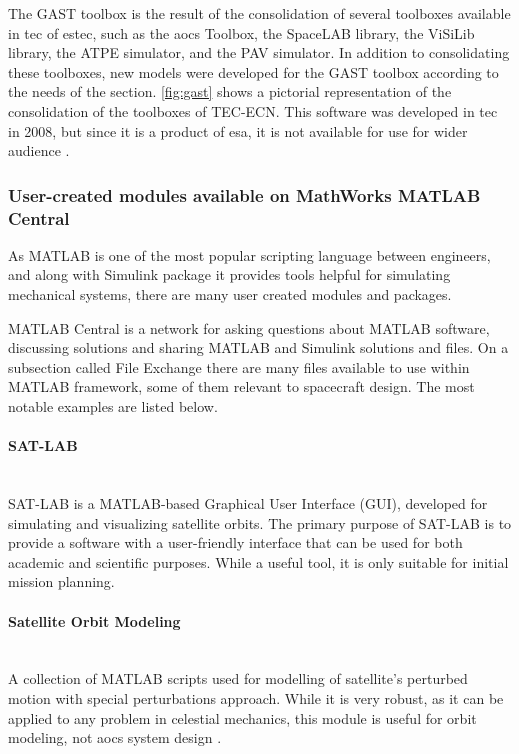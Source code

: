         The GAST toolbox is the result of the consolidation of several toolboxes available in \ac{tec} of \ac{estec}, such as the \ac{aocs} Toolbox, the SpaceLAB library, the ViSiLib library, the ATPE simulator, and the PAV simulator. In addition to consolidating these toolboxes, new models were developed for the GAST toolbox according to the needs of the section. \autoref{fig:gast} shows a pictorial representation of the consolidation of the toolboxes of TEC-ECN. This software was developed in \ac{tec} in 2008, but since it is a product of \ac{esa}, it is not available for use for wider audience \cite{gast}.

    \subsubsection{User-created modules available on MathWorks MATLAB Central}
    As MATLAB is one of the most popular scripting language between engineers, and along with Simulink package it provides tools helpful for simulating mechanical systems, there are many user created modules and packages.
    
    MATLAB Central is a network for asking questions about MATLAB software, discussing solutions and sharing MATLAB and Simulink solutions and files\cite{matlabcentral}. On a subsection called File Exchange there are many files available to use within MATLAB framework, some of them relevant to spacecraft design. The most notable examples are listed below.

        \paragraph*{SAT-LAB}\hspace{0pt}\\
            SAT-LAB is a MATLAB-based Graphical User Interface (GUI), developed for simulating and visualizing satellite orbits. The primary purpose of SAT-LAB is to provide a software with a user-friendly interface that can be used for both academic and scientific purposes. While a useful tool, it is only suitable for initial mission planning\cite{satlab}.

        \paragraph*{Satellite Orbit Modeling}\hspace{0pt}\\
            A collection of MATLAB scripts used for modelling of satellite's perturbed motion with special perturbations approach. While it is very robust, as it can be applied to any problem in celestial mechanics, this module is useful for orbit modeling, not \ac{aocs} system design \cite{som-matlab}.
            
